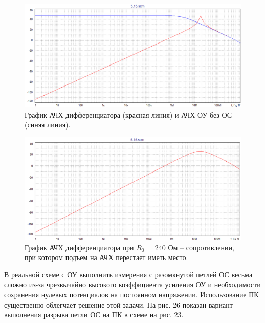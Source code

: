 \documentclass[a4paper,14pt]{extarticle}
\begin{document}
    \begin{figure}[h!]
        \begin{center}
            \includegraphics[scale=0.6]{22.png}
        \end{center}
        \vspace{-0.7cm}
        \caption{График АЧХ дифференциатора (красная линия) и АЧХ ОУ без ОС (синяя линия).} 
    \end{figure}
    \begin{figure}[h!]
        \begin{center}
            \includegraphics[scale=0.6]{23.png}
        \end{center}
        \vspace{-0.7cm}
        \caption{График АЧХ дифференциатора при $R_0$ = 240 Ом – сопротивлении, при котором подъем на АЧХ перестает иметь место.} 
    \end{figure}
 
    В реальной схеме с ОУ выполнить измерения с разомкнутой петлей ОС 
    весьма сложно из-за чрезвычайно высокого коэффициента усиления ОУ и 
    необходимости сохранения нулевых потенциалов на постоянном напряжении. 
    Использование ПК существенно облегчает решение этой задачи. На рис. 26 
    показан вариант выполнения разрыва петли ОС на ПК в схеме на рис. 23.
\end{document}
